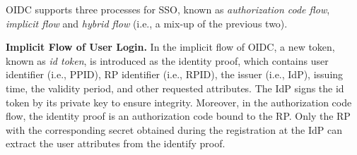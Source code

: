 

OIDC supports three processes for SSO, known as {\em authorization code flow}, {\em implicit flow} and {\em hybrid flow} (i.e., a mix-up of the previous two).

\noindent\textbf{Implicit Flow of User Login.}
In the implicit flow of OIDC, a new token, known as {\em id token}, is introduced as the identity proof, which contains user identifier (i.e., PPID), RP identifier (i.e., RPID), the issuer (i.e., IdP), issuing time, the validity period, and other requested attributes. The IdP signs the id token by its private key to ensure integrity.
Moreover, in the authorization code flow, the identity proof is an authorization code bound to the RP. Only the RP with the corresponding secret obtained during the registration at the IdP can extract the user attributes from the identify proof.

